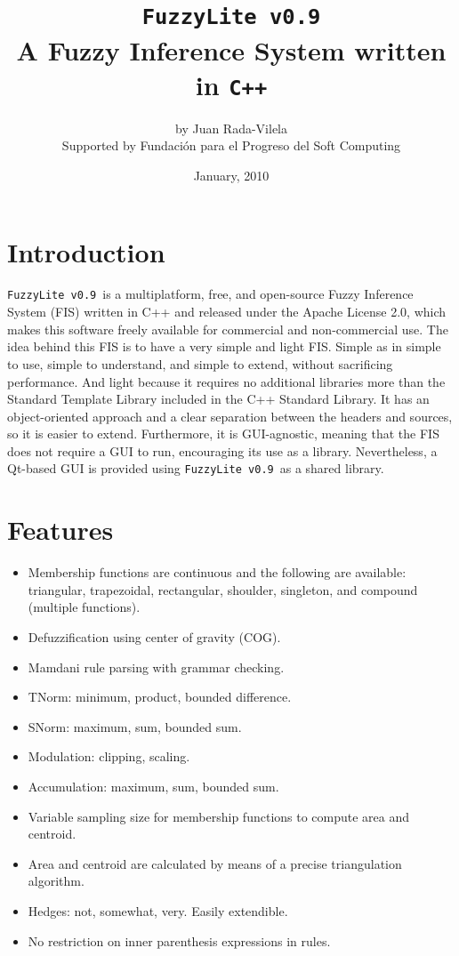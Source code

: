 \documentclass[11pt, final, a4paper]{article}
\newcommand{\fl}{\texttt{FuzzyLite v0.9}}
\begin{document}
	\title{\fl\\A Fuzzy Inference System written in \texttt{C++}}
	\author{by Juan Rada-Vilela\\ \footnotesize Supported by Fundación para el Progreso del Soft Computing}
	\date{January, 2010}
	
	\maketitle
	
	\section{Introduction}
	\fl\ is a multiplatform, free, and open-source Fuzzy Inference System (FIS) written in C++ and released under the Apache License 2.0, which makes this software freely available for commercial and non-commercial use. The idea behind this FIS is to have a very simple and light FIS. Simple as in simple to use, simple to understand, and simple to extend, without sacrificing performance. And light because it requires no additional libraries more than the Standard Template Library included in the C++ Standard Library. It has an object-oriented approach and a clear separation between the headers and sources, so it is easier to extend. Furthermore, it is GUI-agnostic, meaning that the FIS does not require a GUI to run, encouraging its use as a library. Nevertheless, a Qt-based GUI is provided using \fl\ as a shared library.
	
	\section{Features}
	\begin{itemize}
		\item Membership functions are continuous and the following are available: triangular, trapezoidal, rectangular, shoulder, singleton, and compound (multiple functions).
		\item Defuzzification using center of gravity (COG).
		\item Mamdani rule parsing with grammar checking.
		\item TNorm: minimum, product, bounded difference.
		\item SNorm: maximum, sum, bounded sum.
		\item Modulation: clipping, scaling.
		\item Accumulation: maximum, sum, bounded sum.
		\item Variable sampling size for membership functions to compute area and centroid.
		\item Area and centroid are calculated by means of a precise triangulation algorithm.
		\item Hedges: not, somewhat, very. Easily extendible.
		\item No restriction on inner parenthesis expressions in rules.
	\end{itemize}
\end{document}
